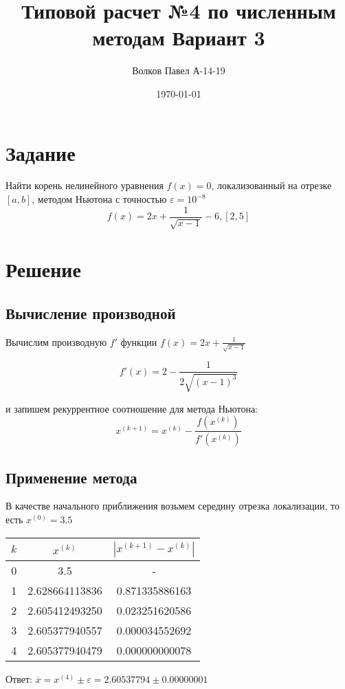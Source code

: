 \documentclass[a4paper,12pt]{report} %
\author{Волков Павел А-14-19}
\title{Типовой расчет №4 по численным методам Вариант 3}
\date{\today}
\begin{document}

\maketitle

\newpage
\section*{Задание}
Найти корень нелинейного уравнения $f(x) = 0$, локализованный на отрезке $[a, b]$, методом Ньютона с точностью $\varepsilon = 10^{-8}$
\[
    f(x) = 2x + \frac{1}{\sqrt{x - 1}} - 6, [2, 5]
\]

\section*{Решение}

\subsection*{Вычисление производной}
Вычислим производную $f'$ функции $f(x) = 2x + \frac{1}{\sqrt{x - 1}}$

\[
    f'(x) = 2 - \frac{1}{2\sqrt{(x - 1)^3}}
\]

\noindent и запишем рекуррентное соотношение для метода Ньютона:
\[
    x^{(k + 1)} = x^{(k)} - \frac{f(x^{(k)})}{f'(x^{(k)})}
\]

\subsection*{Применение метода}
В качестве начального приближения возьмем середину отрезка локализации, то есть $x^{(0)} = 3.5$

\begin{tabular}{|| c | c | c ||}
    \hline
    $k$ & $x^{(k)}$ & $|x^{(k+1)} - x^{(k)}|$ \\ \hline
    0 & 3.5 & - \\ \hline
    1 & 2.628664113836 & 0.871335886163 \\ \hline
    2 & 2.605412493250 & 0.023251620586 \\ \hline
    3 & 2.605377940557 & 0.000034552692 \\ \hline
    4 & 2.605377940479 & 0.000000000078 \\ \hline
\end{tabular}

Ответ: $\overline{x} = x^{(4)} \pm \varepsilon = 2.60537794 \pm 0.00000001$
\end{document}

